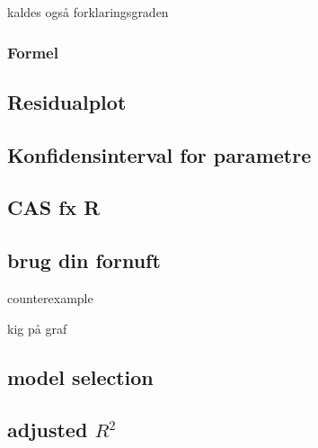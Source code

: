 kaldes også forklaringsgraden

\subsubsection{Formel}


\subsection{Residualplot}


\subsection{Konfidensinterval for parametre}


\subsection{CAS fx R}

\subsection{brug din fornuft}
counterexample

kig på graf

\subsection{model selection}

\subsection{adjusted \(R^2\)}
